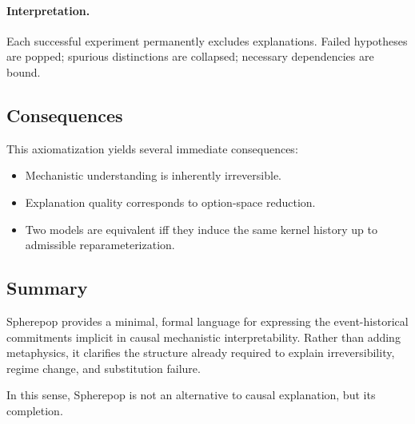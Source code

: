 \documentclass[11pt]{article}
\theoremstyle{remark}
\begin{document}
\paragraph{Interpretation.}
Each successful experiment permanently excludes explanations. Failed
hypotheses are popped; spurious distinctions are collapsed; necessary
dependencies are bound.

\subsection{Consequences}

This axiomatization yields several immediate consequences:
\begin{itemize}
\item Mechanistic understanding is inherently irreversible.
\item Explanation quality corresponds to option-space reduction.
\item Two models are equivalent iff they induce the same kernel history
up to admissible reparameterization.
\end{itemize}

\subsection{Summary}

Spherepop provides a minimal, formal language for expressing the
event-historical commitments implicit in causal mechanistic
interpretability. Rather than adding metaphysics, it clarifies the
structure already required to explain irreversibility, regime change,
and substitution failure.

In this sense, Spherepop is not an alternative to causal explanation,
but its completion.
\end{document}
